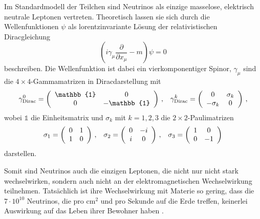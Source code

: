 Im Standardmodell der Teilchen sind Neutrinos als einzige masselose, elektrisch neutrale Leptonen vertreten.
Theoretisch lassen sie sich durch die Wellenfunktionen $\psi$ als lorentzinvariante Lösung der relativistischen Diracgleichung
\begin{equation}
    \left(i \gamma_\mu \frac{\partial}{\partial x_\mu} - m \right) \psi = 0
    \label{eq:dirac}
\end{equation}
beschreiben.
Die Wellenfunktion ist dabei ein vierkomponentiger Spinor, $\gamma_\mu$ sind die $4 \times 4$-Gammamatrizen in Diracdarstellung mit
\begin{align}
    \gamma^0_\text{Dirac} = \left( \begin{array}{c c}
        \mathbb{1} & 0          \\ 
        0          & -\mathbb{1} \\ 
        \end{array}\right) \,,
    &&
    \gamma^k_\text{Dirac} = \left( \begin{array}{c c}
        0           & \sigma_k  \\ 
        -\sigma_k   & 0         \\ 
        \end{array}\right) \,,
    \label{eq:gammamatrizen}
\end{align}
wobei $\mathbb{1}$ die Einheitsmatrix und $\sigma_k$ mit $k = 1, 2, 3$ die $2 \times 2$-Paulimatrizen
\begin{align}
    \sigma_1 = \left( \begin{array}{c c}
        0 & 1   \\ 
        1 & 0   \\ 
        \end{array}\right) \,,
    &&
    \sigma_2 = \left( \begin{array}{c c}
        0           & -i  \\ 
        i  & 0         \\ 
        \end{array}\right) \,,
    &&
    \sigma_3 = \left( \begin{array}{c c}
        1           & 0 \\ 
        0   & -1         \\ 
        \end{array}\right)
    \label{eq:paulimatrizen}
\end{align}
darstellen. 

Somit sind Neutrinos auch die einzigen Leptonen, die nicht nur nicht stark wechselwirken, sondern auch nicht an der elektromagnetischen Wechselwirkung teilnehmen.
Tatsächlich ist ihre Wechselwirkung mit Materie so gering, dass die $7 \cdot 10^{10}$  Neutrinos, die pro $\si{\centi\meter}^2$ und pro Sekunde auf die Erde treffen, keinerlei Auswirkung
auf das Leben ihrer Bewohner haben \cite[S. ~133]{grupen}. 


